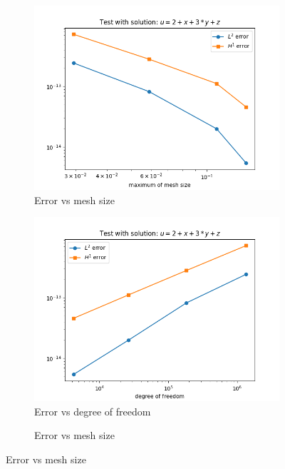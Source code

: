 \documentclass[12pt]{article}%
\theoremstyle{plain}
\numberwithin{equation}{section}
\begin{document}
\begin{figure}[H]%
    \centering
         \begin{subfigure}[h]{0.45\linewidth}
          \caption{Error vs mesh size}
\includegraphics[width=\linewidth]{figures/Ex2/Ex2_test_LU.png}
\end{subfigure}
    \begin{subfigure}[h]{0.45\linewidth}
     \caption{Error vs degree of freedom}
\includegraphics[width=\linewidth]{figures/Ex2/Ex2_test_dof_LU.png}
\end{subfigure}
  \begin{subfigure}[h]{0.45\linewidth}
          \caption{Error vs mesh size}

\end{subfigure}
\end{figure}
\end{document}
